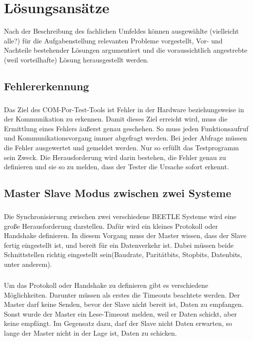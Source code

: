 \chapter{Lösungsansätze}\label{chp:loesungsansaetze}
Nach der Beschreibung des fachlichen Umfeldes können ausgewählte (vielleicht alle?) für die Aufgabenstellung relevanten Probleme vorgestellt, Vor- und Nachteile bestehender Lösungen argumentiert und die voraussichtlich angestrebte (weil vorteilhafte) Lösung herausgestellt werden.


\section{Fehlererkennung}
\paragraph{}
Das Ziel des COM-Por-Test-Tools ist Fehler in der Hardware beziehungsweise in der Kommunikation zu erkennen. Damit dieses Ziel erreicht wird, muss die Ermittlung eines Fehlers äußerst genau geschehen. So muss jeden Funktionsaufruf und Kommunikationsvorgang immer abgefragt werden. Bei jeder Abfrage müssen die Fehler ausgewertet und gemeldet werden. Nur so erfüllt das Testprogramm sein Zweck. Die Herausforderung wird darin bestehen, die Fehler genau zu definieren und sie so zu melden, dass der Tester die Ursache sofort erkennt.

\section{Master Slave Modus zwischen zwei Systeme}
\paragraph{}
Die Synchronisierung zwischen zwei verschiedene BEETLE Systeme wird eine große Herausforderung darstellen. Dafür wird ein kleines Protokoll oder Handshake definieren. In diesem Vorgang muss der Master wissen, dass der Slave fertig eingestellt ist, und bereit für ein Datenverkehr ist. Dabei müssen beide Schnittstellen richtig eingestellt sein(Baudrate, Paritätbits, Stopbits, Datenbits, unter anderem).

\paragraph{}
Um das Protokoll oder Handshake zu definieren gibt es verschiedene Möglichkeiten. Darunter müssen als erstes die Timeouts beachtete werden. Der Master darf keine Senden, bevor der Slave nicht bereit ist, Daten zu empfangen. Sonst wurde der Master ein Lese-Timeout melden, weil er Daten schickt, aber keine empfängt. Im Gegensatz dazu, darf der Slave nicht Daten erwarten, so lange der Master nicht in der Lage ist, Daten zu schicken.

